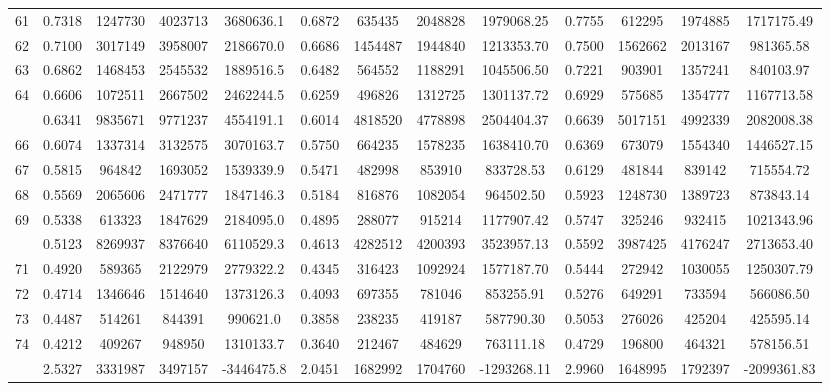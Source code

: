 \documentclass[
  12pt,
]{article}
\begin{document}
\begin{longtable}[t]{lcccccccccccc}
61 & 0.7318 & 1247730 & 4023713 & 3680636.1 & 0.6872 & 635435 & 2048828 & 1979068.25 & 0.7755 & 612295 & 1974885 & 1717175.49\\
62 & 0.7100 & 3017149 & 3958007 & 2186670.0 & 0.6686 & 1454487 & 1944840 & 1213353.70 & 0.7500 & 1562662 & 2013167 & 981365.58\\
63 & 0.6862 & 1468453 & 2545532 & 1889516.5 & 0.6482 & 564552 & 1188291 & 1045506.50 & 0.7221 & 903901 & 1357241 & 840103.97\\
64 & 0.6606 & 1072511 & 2667502 & 2462244.5 & 0.6259 & 496826 & 1312725 & 1301137.72 & 0.6929 & 575685 & 1354777 & 1167713.58\\
\addlinespace
65 & 0.6341 & 9835671 & 9771237 & 4554191.1 & 0.6014 & 4818520 & 4778898 & 2504404.37 & 0.6639 & 5017151 & 4992339 & 2082008.38\\
66 & 0.6074 & 1337314 & 3132575 & 3070163.7 & 0.5750 & 664235 & 1578235 & 1638410.70 & 0.6369 & 673079 & 1554340 & 1446527.15\\
67 & 0.5815 & 964842 & 1693052 & 1539339.9 & 0.5471 & 482998 & 853910 & 833728.53 & 0.6129 & 481844 & 839142 & 715554.72\\
68 & 0.5569 & 2065606 & 2471777 & 1847146.3 & 0.5184 & 816876 & 1082054 & 964502.50 & 0.5923 & 1248730 & 1389723 & 873843.14\\
69 & 0.5338 & 613323 & 1847629 & 2184095.0 & 0.4895 & 288077 & 915214 & 1177907.42 & 0.5747 & 325246 & 932415 & 1021343.96\\
\addlinespace
70 & 0.5123 & 8269937 & 8376640 & 6110529.3 & 0.4613 & 4282512 & 4200393 & 3523957.13 & 0.5592 & 3987425 & 4176247 & 2713653.40\\
71 & 0.4920 & 589365 & 2122979 & 2779322.2 & 0.4345 & 316423 & 1092924 & 1577187.70 & 0.5444 & 272942 & 1030055 & 1250307.79\\
72 & 0.4714 & 1346646 & 1514640 & 1373126.3 & 0.4093 & 697355 & 781046 & 853255.91 & 0.5276 & 649291 & 733594 & 566086.50\\
73 & 0.4487 & 514261 & 844391 & 990621.0 & 0.3858 & 238235 & 419187 & 587790.30 & 0.5053 & 276026 & 425204 & 425595.14\\
74 & 0.4212 & 409267 & 948950 & 1310133.7 & 0.3640 & 212467 & 484629 & 763111.18 & 0.4729 & 196800 & 464321 & 578156.51\\
\addlinespace
75 & 2.5327 & 3331987 & 3497157 & -3446475.8 & 2.0451 & 1682992 & 1704760 & -1293268.11 & 2.9960 & 1648995 & 1792397 & -2099361.83\\*
\end{longtable}
\endgroup{}
\end{document}
